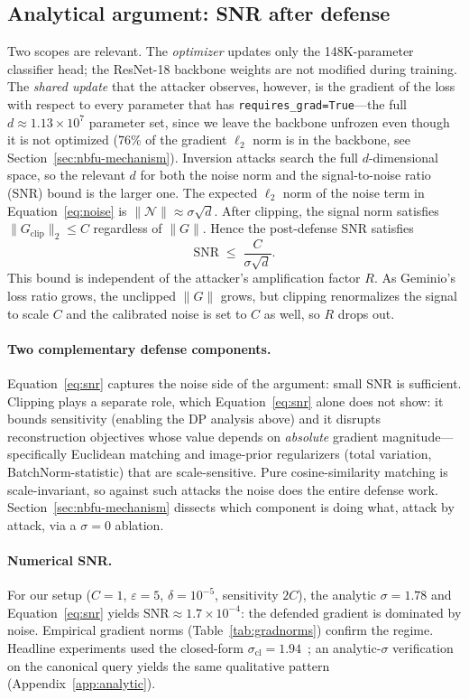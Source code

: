 \documentclass[11pt]{article}
\begin{document}
\subsection{Analytical argument: SNR after defense}
\label{sec:snr}
Two scopes are relevant. The \emph{optimizer} updates only the 148K-parameter classifier head; the ResNet-18 backbone weights are not modified during training. The \emph{shared update} that the attacker observes, however, is the gradient of the loss with respect to every parameter that has \texttt{requires\_grad=True}---the full $d\approx 1.13{\times}10^{7}$ parameter set, since we leave the backbone unfrozen even though it is not optimized (76\% of the gradient $\ell_2$ norm is in the backbone, see Section~\ref{sec:nbfu-mechanism}). Inversion attacks search the full $d$-dimensional space, so the relevant $d$ for both the noise norm and the signal-to-noise ratio (SNR) bound is the larger one. The expected $\ell_2$ norm of the noise term in Equation~\ref{eq:noise} is $\|\mathcal{N}\| \approx \sigma\sqrt{d}$. After clipping, the signal norm satisfies $\|G_{\text{clip}}\|_2 \le C$ regardless of $\|G\|$. Hence the post-defense SNR satisfies
\begin{equation}
\mathrm{SNR} \;\le\; \frac{C}{\sigma\sqrt{d}}.
\label{eq:snr}
\end{equation}
This bound is independent of the attacker's amplification factor $R$. As Geminio's loss ratio grows, the unclipped $\|G\|$ grows, but clipping renormalizes the signal to scale $C$ and the calibrated noise is set to $C$ as well, so $R$ drops out.

\paragraph{Two complementary defense components.}
Equation~\ref{eq:snr} captures the noise side of the argument: small SNR is sufficient. Clipping plays a separate role, which Equation~\ref{eq:snr} alone does not show: it bounds sensitivity (enabling the DP analysis above) and it disrupts reconstruction objectives whose value depends on \emph{absolute} gradient magnitude---specifically Euclidean matching and image-prior regularizers (total variation, BatchNorm-statistic) that are scale-sensitive. Pure cosine-similarity matching is scale-invariant, so against such attacks the noise does the entire defense work. Section~\ref{sec:nbfu-mechanism} dissects which component is doing what, attack by attack, via a $\sigma{=}0$ ablation.

\paragraph{Numerical SNR.}
For our setup ($C{=}1$, $\varepsilon{=}5$, $\delta{=}10^{-5}$, sensitivity $2C$), the analytic $\sigma{=}1.78$ and Equation~\ref{eq:snr} yields $\mathrm{SNR}{\approx}1.7{\times}10^{-4}$: the defended gradient is dominated by noise. Empirical gradient norms (Table~\ref{tab:gradnorms}) confirm the regime. Headline experiments used the closed-form $\sigma_{\text{cl}}{=}1.94$~\citep{differentialprivacy2014}; an analytic-$\sigma$ verification on the canonical query yields the same qualitative pattern (Appendix~\ref{app:analytic}).
\end{document}
